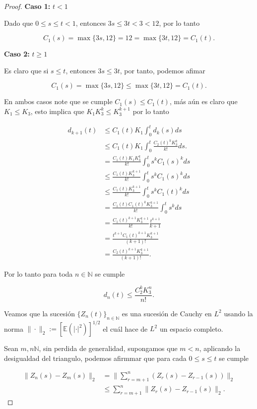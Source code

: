 \documentclass[
  spanish,
  us-letterpaper,
]{scrreprt}
\theoremstyle{plain}
\theoremstyle{plain}
\theoremstyle{definition}
\theoremstyle{plain}
\theoremstyle{remark}
\begin{document}
\begin{proof}
\textbf{Caso 1:} \(t<1\)

Dado que \(0\leq s\leq t<1\), entonces \(3s\leq 3t<3<12\), por lo tanto

\[
    C_1(s)=\max\{3s,12\}=12=\max\{3t,12\}=C_1(t).
\]

\textbf{Caso 2:} \(t\geq 1\)

Es claro que si \(s\leq t\), entonces \(3s\leq 3t\), por tanto, podemos
afimar

\[
    C_1(s)=\max\{3s,12\}\leq \max\{3t,12\}=C_1(t).
\]

En ambos casos note que se cumple \(C_1(s)\leq C_1(t)\), más aún es
claro que \(K_1\leq K_3\), esto implica que \(K_1K_3^k\leq K_3^{k+1}\)
por lo tanto

\[
    \begin{aligned}
        d_{k+1}(t) & \leq C_1(t)K_1\int_0^t d_k(s)ds\\ 
        & \leq C_1(t)K_1\int_0^t \frac{C_2(t)^k K_3^k}{k!}ds.\\ 
        & = \frac{C_1(t)K_1 K_3^k}{k!}\int_0^t s^kC_1(s)^k ds\\ 
        & \leq \frac{C_1(t)K_3^{k+1}}{k!}\int_0^t s^k C_1(s)^k ds\\
        & \leq \frac{C_1(t)K_3^{k+1}}{k!}\int_0^t s^k C_1(t)^k ds\\ 
        & = \frac{C_1(t)C_1(t)^k K_3^{k+1}}{k!}\int_0^t s^k ds\\ 
        & = \frac{C_1(t)^{k+1}K_3^{k+1}}{k!}\frac{t^{k+1}}{k+1}\\ 
        & = \frac{t^{k+1}C_1(t)^{k+1}K_3^{k+1}}{(k+1)!}\\ 
        & = \frac{C_2(t)^{k+1}K_3^{k+1}}{(k+1)!}.
    \end{aligned}
\]

Por lo tanto para toda \(n\in \mathbb{N}\) se cumple

\[
d_{n}(t)\leq \frac{C_2^k K_3^n}{n!}.
\]

Veamos que la sucesión \(\{Z_n(t)\}_{n\in \mathbb{N}}\) es una sucesión
de Cauchy en \(L^2\) usando la norma
\(\|\cdot\|_2:=[\mathbb{E}(|\cdot|^2)]^{1/2}\) el cuál hace de \(L^2\)
un espacio completo.

Sean \(m,n\mathbb{N}\), sin perdida de generalidad, supongamos que
\(m<n\), aplicando la desigualdad del triangulo, podemos afirmmar que
para cada \(0\leq s\leq t\) se cumple

\[
    \begin{aligned}
        \|Z_n(s)-Z_m(s)\|_2 & = \Bigg\|\sum\limits_{r=m+1}^n (Z_r(s)-Z_{r-1}(s))\Bigg\|_2\\ 
        & \leq \sum\limits_{r=m+1}^n\|Z_r(s)-Z_{r-1}(s)\|_2.
    \end{aligned}
\]


\end{proof}
\end{document}
